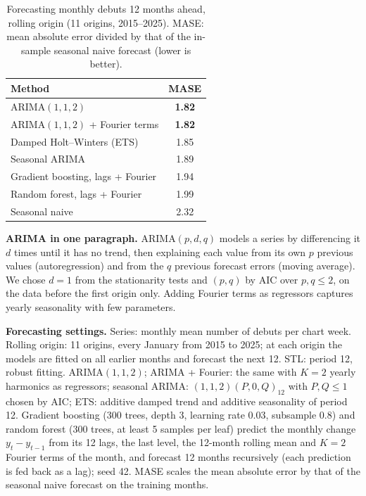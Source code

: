 \begin{table}[!htbp]
\centering
\caption{Forecasting monthly debuts 12 months ahead, rolling origin (11 origins, 2015--2025). MASE: mean
absolute error divided by that of the in-sample seasonal naive forecast (lower is better).}
\label{tab:forecast}
\footnotesize
\begin{tabular}{@{}lc@{}}
\toprule
Method & MASE \\
\midrule
ARIMA$(1,1,2)$ & \textbf{1.82} \\
ARIMA$(1,1,2)$ + Fourier terms & \textbf{1.82} \\
Damped Holt--Winters (ETS) & 1.85 \\
Seasonal ARIMA & 1.89 \\
Gradient boosting, lags + Fourier & 1.94 \\
Random forest, lags + Fourier & 1.99 \\
Seasonal naive & 2.32 \\
\bottomrule
\end{tabular}
\end{table}

\textbf{ARIMA in one paragraph.} ARIMA$(p,d,q)$ models a series by differencing it $d$ times until it has
no trend, then explaining each value from its own $p$ previous values (autoregression) and from the $q$
previous forecast errors (moving average). We chose $d=1$ from the stationarity tests and $(p,q)$ by AIC
over $p,q\leq2$, on the data before the first origin only. Adding Fourier terms as regressors captures yearly
seasonality with few parameters.

\textbf{Forecasting settings.} Series: monthly mean number of debuts per chart week. Rolling origin: 11 origins,
every January from 2015 to 2025; at each origin the models are fitted on all earlier months and forecast the next
12. STL: period 12, robust fitting. ARIMA$(1,1,2)$; ARIMA + Fourier: the same with $K=2$ yearly harmonics as
regressors; seasonal ARIMA: $(1,1,2)(P,0,Q)_{12}$ with $P,Q\leq1$ chosen by AIC; ETS: additive damped trend and
additive seasonality of period 12. Gradient boosting (300 trees, depth 3, learning rate 0.03, subsample 0.8) and
random forest (300 trees, at least 5 samples per leaf) predict the monthly change $y_t-y_{t-1}$ from its 12 lags,
the last level, the 12-month rolling mean and $K=2$ Fourier terms of the month, and forecast 12 months recursively
(each prediction is fed back as a lag); seed 42. MASE scales the mean absolute error by that of the seasonal naive
forecast on the training months.

